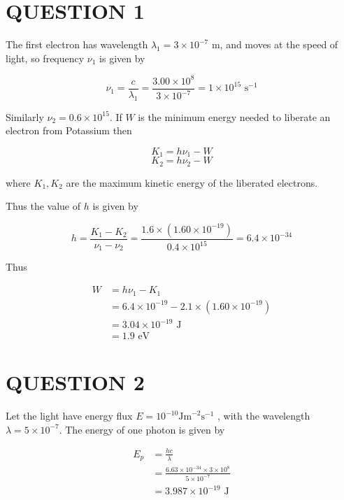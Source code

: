 \documentclass[a4paper]{article}
\begin{document}
	
\maketitle

\section{QUESTION 1}

The first electron has wavelength $ \lambda_{1} = 3 \times 10^{-7} $ m, and moves at the speed of light, so frequency $ \nu_{1} $ is given by

\[ \nu_{1} = \frac{c}{\lambda_{1}} = \frac{3.00 \times 10^{8}}{3 \times 10^{-7}} = 1 \times 10^{15} \text{ s}^{-1}  \]

Similarly $ \nu_{2} =  0.6 \times 10^{15} $. If $ W $ is the minimum energy needed to liberate an electron from Potassium then

\[ K_{1} = h \nu_{1} - W \]
\[  K_{2} = h \nu_{2} - W \]

where $ K_{1},K_{2} $ are the maximum kinetic energy of the liberated electrons. 

Thus the value of $ h $ is given by

\[ h = \frac{K_{1} - K_{2}}{\nu_{1} - \nu_{2}} = \frac{1.6 \times (1.60 \times 10^{-19})}{0.4 \times 10^{15}} = 6.4 \times 10^{-34}\]

Thus 


\begin{align*}
W & = h\nu_{1} - K_{1} \\
& = 6.4 \times 10^{-19} - 2.1 \times (1.60 \times 10^{-19}) \\
& = 3.04 \times 10^{-19} \text{ J} \\
& = 1.9 \text{ eV}
\end{align*}

\section{QUESTION 2}

Let the light have energy flux $ E = 10^{-10} \text{Jm}^{-2}\text{s}^{-1} $ , with the wavelength $ \lambda = 5 \times 10^{-7} $. The energy of one photon is given by

\begin{align*}
E_{p} & = \frac{h c}{\lambda} \\
& = \frac{6.63 \times 10^{-34} \times 3 \times 10^{8} }{5 \times 10^{-7}}\\
& = 3.987 \times 10^{-19} \text{ J}
\end{align*}
\end{document}
